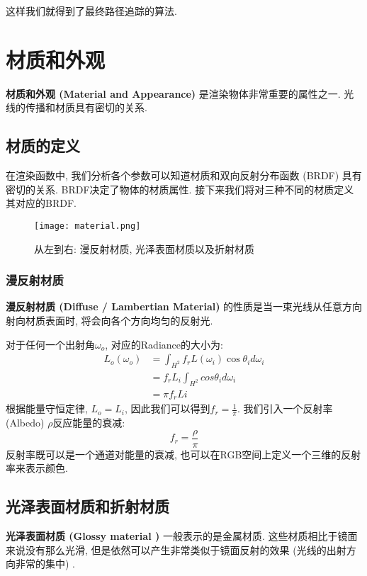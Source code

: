这样我们就得到了最终路径追踪的算法. 


\chapter{材质和外观}

\textbf{材质和外观 (Material and Appearance) }是渲染物体非常重要的属性之一. 光线的传播和材质具有密切的关系. 

\section{材质的定义}

在渲染函数中, 我们分析各个参数可以知道材质和双向反射分布函数 (BRDF) 具有密切的关系. BRDF决定了物体的材质属性. 接下来我们将对三种不同的材质定义其对应的BRDF. 

\begin{figure}[H]
	\centering
	\texttt{[image: material.png]}
	\caption{从左到右: 漫反射材质, 光泽表面材质以及折射材质}
	\label{fig:material}
\end{figure}

\subsection{漫反射材质}
\textbf{漫反射材质 (Diffuse / Lambertian Material) }的性质是当一束光线从任意方向射向材质表面时, 将会向各个方向均匀的反射光. 

对于任何一个出射角$\omega_o$, 对应的Radiance的大小为: 
\begin{equation}
	\begin{split}
		L_o(\omega_o)&=\int_{H^2}f_rL(\omega_i)\cos\theta_id\omega_i\\
		&=f_rL_i\int_{H^2}cos\theta_id\omega_i\\
		&=\pi f_r Li
	\end{split}
\end{equation}
根据能量守恒定律, $L_o=L_i$, 因此我们可以得到$f_r=\frac{1}{\pi}$. 我们引入一个反射率 (Albedo) $\rho$反应能量的衰减: 
\begin{equation}
	f_r=\frac{\rho}{\pi}
\end{equation}
反射率既可以是一个通道对能量的衰减, 也可以在RGB空间上定义一个三维的反射率来表示颜色. 

\section{光泽表面材质和折射材质}

\textbf{光泽表面材质 (Glossy material ) }一般表示的是金属材质. 这些材质相比于镜面来说没有那么光滑, 但是依然可以产生非常类似于镜面反射的效果 (光线的出射方向非常的集中) . 

